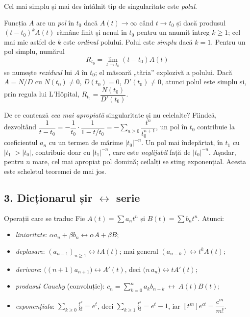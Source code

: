Cel mai simplu și mai des întâlnit tip de singularitate este \emph{polul}.

\begin{definitie}
Funcția $A$ are un \emph{pol} în $t_0$ dacă $A(t)\to\infty$ când $t\to t_0$ și dacă produsul $(t-t_0)^kA(t)$ rămâne finit și nenul în $t_0$ pentru un anumit întreg $k\ge1$; cel mai mic astfel de $k$ este \emph{ordinul} polului. Polul este \emph{simplu} dacă $k=1$. Pentru un pol simplu, numărul
\[
R_{t_0}=\lim_{t\to t_0}(t-t_0)A(t)
\]
se numește \emph{reziduul} lui $A$ în $t_0$; el măsoară „tăria'' explozivă a polului. Dacă $A=N/D$ cu $N(t_0)\neq0$, $D(t_0)=0$, $D'(t_0)\neq0$, atunci polul este simplu și, prin regula lui L'H\^opital, $R_{t_0}=\dfrac{N(t_0)}{D'(t_0)}$.
\end{definitie}

\begin{obs}
De ce contează \emph{cea mai apropiată} singularitate și nu celelalte? Fiindcă, dezvoltând $\dfrac{1}{t-t_0}=-\dfrac{1}{t_0}\cdot\dfrac{1}{1-t/t_0}=-\sum_{n\ge0}\dfrac{t^n}{t_0^{n+1}}$, un pol în $t_0$ contribuie la coeficientul $a_n$ cu un termen de mărime $|t_0|^{-n}$. Un pol mai îndepărtat, în $t_1$ cu $|t_1|>|t_0|$, contribuie doar cu $|t_1|^{-n}$, care este \emph{neglijabil} față de $|t_0|^{-n}$. Așadar, pentru $n$ mare, cel mai apropiat pol domină; ceilalți se sting exponențial. Acesta este scheletul teoremei de mai jos.
\end{obs}

\subsection*{3. Dicționarul șir $\leftrightarrow$ serie}

\begin{tehbox}{Operații care se traduc}
Fie $A(t)=\sum a_nt^n$ și $B(t)=\sum b_nt^n$. Atunci:
\begin{itemize}[leftmargin=*, itemsep=1pt]
\item \emph{liniaritate}: $\alpha a_n+\beta b_n\leftrightarrow\alpha A+\beta B$;
\item \emph{deplasare}: $(a_{n-1})_{n\ge1}\leftrightarrow tA(t)$; mai general $(a_{n-k})\leftrightarrow t^kA(t)$;
\item \emph{derivare}: $\bigl((n+1)a_{n+1}\bigr)\leftrightarrow A'(t)$, deci $\bigl(n\,a_n\bigr)\leftrightarrow tA'(t)$;
\item \emph{produsul Cauchy} (convoluție): $c_n=\displaystyle\sum_{k=0}^{n}a_kb_{n-k}\ \leftrightarrow\ A(t)B(t)$;
\item \emph{exponențiala}: $\displaystyle\sum_{k\ge0}\frac{t^k}{k!}=e^t$, deci $\displaystyle\sum_{k\ge1}\frac{t^k}{k!}=e^t-1$, iar $[t^m]e^{ct}=\dfrac{c^m}{m!}$.
\end{itemize}
\end{tehbox}

